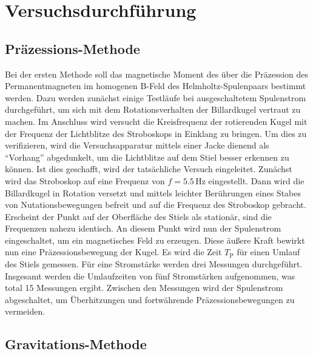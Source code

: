 \section{Versuchsdurchführung}
\subsection{Präzessions-Methode}

\noindent Bei der ersten Methode soll das magnetische Moment des über die Präzession des Permanentmagneten im homogenen 
B-Feld des Helmholtz-Spulenpaars bestimmt werden. Dazu werden zunächst einige Testläufe bei ausgeschaltetem Spulenstrom 
durchgeführt, um sich mit dem Rotationsverhalten der Billardkugel vertraut zu machen. Im Anschluss wird versucht die Kreisfrequenz 
der rotierenden Kugel mit der Frequenz der Lichtblitze des Stroboskops in Einklang zu bringen. Um dies zu verifizieren, wird 
die Versuchsapparatur mittels einer Jacke dienend als \enquote{Vorhang} abgedunkelt, um die Lichtblitze auf dem Stiel besser 
erkennen zu können. Ist dies geschafft, wird der tatsächliche Versuch eingeleitet. Zunächst wird das Stroboskop auf eine 
Frequenz von $f = 5.5\,\unit{\hertz}$ eingestellt. Dann wird die Billardkugel in Rotation versetzt und mittels leichter
Berührungen eines Stabes von Nutationsbewegungen befreit und auf die Frequenz des Stroboskop gebracht. Erscheint der Punkt auf 
der Oberfläche des Stiels als stationär, sind die Frequenzen nahezu identisch. An diesem Punkt wird nun der Spulenstrom 
eingeschaltet, um ein magnetisches Feld zu erzeugen. Diese äußere Kraft bewirkt nun eine Präzessionsbewegung der Kugel. Es wird 
die Zeit $T_\text{P}$ für einen Umlauf des Stiels gemessen. Für eine Stromstärke werden drei Messungen durchgeführt. Insgesamt werden 
die Umlaufzeiten von fünf Stromstärken aufgenommen, was total 15 Messungen ergibt. Zwischen den Messungen wird der Spulenstrom 
abgeschaltet, um Überhitzungen und fortwährende Präzessionsbewegungen zu vermeiden.

\subsection{Gravitations-Methode}

